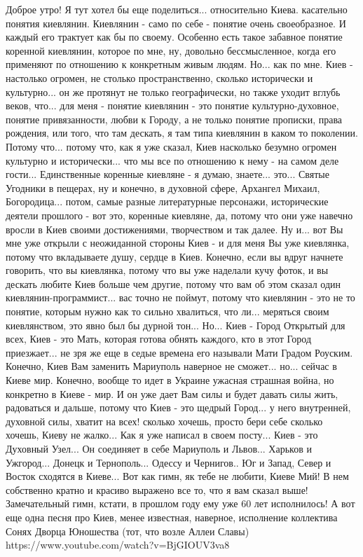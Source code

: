 Доброе утро! Я тут хотел бы еще поделиться... относительно Киева. касательно
понятия киевлянин. Киевлянин - само по себе - понятие очень своеобразное. И
каждый его трактует как бы по своему. Особенно есть такое забавное понятие
коренной киевлянин, которое по мне, ну, довольно бессмысленное, когда его
применяют по отношению к конкретным живым людям. Но... как по мне.  Киев -
настолько огромен, не столько пространственно, сколько исторически и
культурно... он же протянут не только географически, но также уходит вглубь
веков, что... для меня - понятие киевлянин - это понятие культурно-духовное,
понятие привязанности, любви к Городу, а не только понятие прописки, права
рождения, или того, что там дескать, я там типа киевлянин в каком то поколении.
Потому что... потому что, как я уже сказал, Киев насколько безумно огромен
культурно и исторически... что мы все по отношению к нему - на самом деле
гости... Единственные коренные киевляне - я думаю, знаете... это... Святые
Угодники в пещерах, ну и конечно, в духовной сфере, Архангел Михаил,
Богородица... потом, самые разные литературные персонажи, исторические деятели
прошлого - вот это, коренные киевляне, да, потому что они уже навечно вросли в
Киев своими достижениями, творчеством и так далее. Ну и... вот Вы мне уже
открыли с неожиданной стороны Киев - и для меня Вы уже киевлянка, потому что
вкладываете душу, сердце в Киев. Конечно, если вы вдруг начнете говорить, что
вы киевлянка, потому что вы уже наделали кучу фоток, и вы дескать любите Киев
больше чем другие, потому что вам об этом сказал один киевлянин-программист...
вас точно не поймут, потому что киевлянин - это не то понятие, которым нужно
как то сильно хвалиться, что ли... меряться своим киевлянством, это явно был бы
дурной тон... Но... Киев - Город Открытый для всех, Киев - это Мать, которая
готова обнять каждого, кто в этот Город приезжает... не зря же еще в седые
времена его называли Мати Градом Роуским. Конечно, Киев Вам заменить Мариуполь
наверное не сможет... но... сейчас в Киеве мир. Конечно, вообще то идет в
Украине ужасная страшная война, но конкретно в Киеве - мир. И он уже дает Вам
силы и будет давать силы жить, радоваться и дальше, потому что Киев - это
щедрый Город... у него внутренней, духовной силы, хватит на всех! сколько
хочешь, просто бери себе сколько хочешь, Киеву не жалко... Как я уже написал в
своем посту... Киев - это Духовный Узел... Он соединяет в себе Мариуполь и
Львов... Харьков и Ужгород... Донецк и Тернополь... Одессу и Чернигов.. Юг и
Запад, Север и Восток сходятся в Киеве... Вот как гимн, як тебе не любити,
Киеве Мий! В нем собственно кратно и красиво выражено все то, что я вам сказал
выше! Замечательный гимн, кстати, в прошлом году ему уже 60 лет исполнилось! А
вот еще одна песня про Киев, менее известная, наверное, исполнение коллектива
Сонях Дворца Юношества (тот, что возле Аллеи Славы)
https://www.youtube.com/watch?v=BjGIOUV3va8

